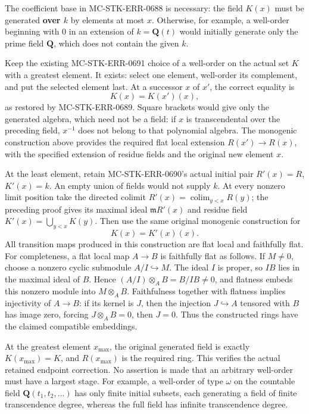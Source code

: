 The coefficient base in MC-\AlgebraIdentifierBreak{}STK-\AlgebraIdentifierBreak{}ERR-\AlgebraIdentifierBreak{}0688 is necessary: the field \(K(x)\) must be generated \textbf{over \(k\)} by elements at most \(x\). Otherwise, for example, a well-order beginning with \(0\) in an extension of \(k=\mathbf Q(t)\) would initially generate only the prime field \(\mathbf Q\), which does not contain the given \(k\).

Keep the existing MC-\AlgebraIdentifierBreak{}STK-\AlgebraIdentifierBreak{}ERR-\AlgebraIdentifierBreak{}0691 choice of a well-order on the actual set \(K\) with a greatest element. It exists: select one element, well-order its complement, and put the selected element last. At a successor \(x\) of \(x'\), the correct equality is \[
 K(x)=K(x')(x),
\] as restored by MC-\AlgebraIdentifierBreak{}STK-\AlgebraIdentifierBreak{}ERR-\AlgebraIdentifierBreak{}0689. Square brackets would give only the generated algebra, which need not be a field: if \(x\) is transcendental over the preceding field, \(x^{-1}\) does not belong to that polynomial algebra. The monogenic construction above provides the required flat local extension \(R(x')\to R(x)\), with the specified extension of residue fields and the original new element \(x\).

At the least element, retain MC-\AlgebraIdentifierBreak{}STK-\AlgebraIdentifierBreak{}ERR-\AlgebraIdentifierBreak{}0690's actual initial pair \(R'(x)=R\), \(K'(x)=k\). An empty union of fields would not supply \(k\). At every nonzero limit position take the directed colimit \(R'(x)=\operatorname*{colim}_{y<x}R(y)\); the preceding proof gives its maximal ideal \(\mathfrak mR'(x)\) and residue field \(K'(x)=\bigcup_{y<x}K(y)\). Then use the same original monogenic construction for \[
 K(x)=K'(x)(x).
\] All transition maps produced in this construction are flat local and faithfully flat. For completeness, a flat local map \(A\to B\) is faithfully flat as follows. If \(M\ne0\), choose a nonzero cyclic submodule \(A/I\hookrightarrow M\). The ideal \(I\) is proper, so \(IB\) lies in the maximal ideal of \(B\). Hence \((A/I)\otimes_A B=B/IB\ne0\), and flatness embeds this nonzero module into \(M\otimes_A B\). Faithfulness together with flatness implies injectivity of \(A\to B\): if its kernel is \(J\), then the injection \(J\hookrightarrow A\) tensored with \(B\) has image zero, forcing \(J\otimes_A B=0\), then \(J=0\). Thus the constructed rings have the claimed compatible embeddings.

At the greatest element \(x_{\max}\), the original generated field is exactly \(K(x_{\max})=K\), and \(R(x_{\max})\) is the required ring. This verifies the actual retained endpoint correction. No assertion is made that an arbitrary well-order must have a largest stage. For example, a well-order of type \(\omega\) on the countable field \(\mathbf Q(t_1,t_2,\ldots)\) has only finite initial subsets, each generating a field of finite transcendence degree, whereas the full field has infinite transcendence degree.

